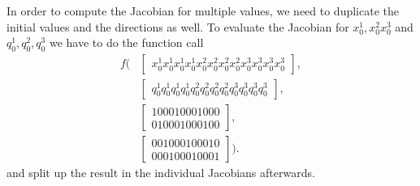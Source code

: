 In order to compute the Jacobian for multiple values, we need to duplicate the initial values and the directions as well.
To evaluate the Jacobian for $x_0^1,x_0^2x_0^3$ and $q_0^1, q_0^2, q_0^3$ we have to do the function call 
\begin{align}
  f(
    &\begin{bmatrix}
    x_0^1  x_0^1  x_0^1  x_0^1
    x_0^2  x_0^2  x_0^2  x_0^2
    x_0^3  x_0^3  x_0^3  x_0^3
    \end{bmatrix},  \\
    &\begin{bmatrix}
    q_0^1   q_0^1 q_0^1 q_0^1
    q_0^2   q_0^2 q_0^2 q_0^2
    q_0^3   q_0^3 q_0^3 q_0^3
    \end{bmatrix}, \\
    &\begin{bmatrix} 1 0 0 0  1 0 0 0 1 0 0 0 \\ 0 1 0 0 0 1 0 0 0 1 0 0\end{bmatrix}, \\
    &\begin{bmatrix}  0 0 1 0  0 0 1 0 0 0 1 0  \\   0 0 0 1  0 0 0 1 0 0 0 1 \end{bmatrix}).
\end{align}
and split up the result in the individual Jacobians afterwards.